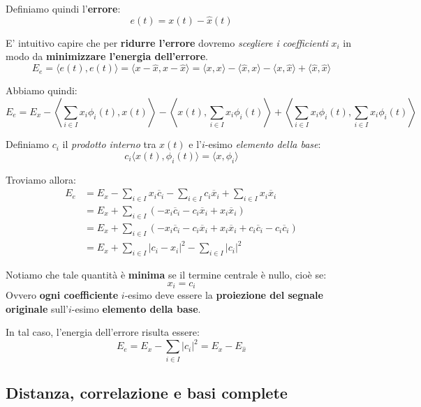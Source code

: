 Definiamo quindi l'\textbf{errore}:
\[
    e(t) = x(t) - \hat{x}(t)
\]

E' intuitivo capire che per \textbf{ridurre l'errore} dovremo \textit{scegliere i coefficienti}
$x_i$ in modo da \textbf{minimizzare l'energia dell'errore}.
\[
    E_e = \langle e(t), e(t) \rangle 
    = \langle x - \hat{x}, x - \hat{x} \rangle
    = \langle x,x \rangle - \langle \hat{x}, x \rangle 
    - \langle x, \hat{x} \rangle + \langle \hat{x}, \hat{x} \rangle
\]

Abbiamo quindi:
\[
    E_e = E_x - \left\langle \sum_{i\in I} x_i \phi_i(t), x(t) \right\rangle
    - \left\langle x(t), \sum_{i\in I} x_i \phi_i(t) \right\rangle
    + \left\langle \sum_{i\in I} x_i \phi_i(t), \sum_{i\in I} x_i \phi_i(t) \right\rangle
\]

Definiamo $c_i$ il \textit{prodotto interno} tra $x(t)$ e l'$i$-esimo
\textit{elemento della base}:
\[
    c_i \langle x(t), \phi_i(t) \rangle = \langle x, \phi_i \rangle
\]

Troviamo allora:
\[
    \begin{aligned}
        E_e &= E_x - \sum_{i\in I} x_i \overline{c}_i 
        - \sum_{i\in I} c_i \overline{x}_i + \sum_{i\in I} x_i \overline{x}_i \\ 
            &= E_x + \sum_{i\in I} ( -x_i \overline{c}_i - c_i \overline{x}_i + x_i \overline{x}_i ) \\ 
            &= E_x + \sum_{i\in I} ( -x_i \overline{c}_i - c_i \overline{x}_i + x_i \overline{x}_i 
             + c_i \overline{c}_i - c_i \overline{c}_i ) \\ 
            &= E_x + \sum_{i\in I} | c_i - x_i |^2 - \sum_{i\in I} |c_i|^2
    \end{aligned}
\]

\begin{remark}[MINIMO]
    Notiamo che tale quantità è \textbf{minima} se il termine centrale 
    è nullo, cioè se:
    \[
        x_i = c_i
    \] 
    Ovvero \textbf{ogni coefficiente} $i$-esimo deve essere la 
    \textbf{proiezione del segnale originale} sull'$i$-esimo
    \textbf{elemento della base}.
\end{remark}

In tal caso, l'energia dell'errore risulta essere:
\[
    E_e = E_x - \sum_{i\in I} |c_i|^2 = E_x - E_{\hat{x}}
\]

\subsection{Distanza, correlazione e basi complete}

